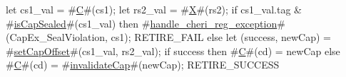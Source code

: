 let cs1_val = #\hyperref[sailRISCVzC]{C}#(cs1);
let rs2_val = #\hyperref[sailRISCVzX]{X}#(rs2);
if cs1_val.tag & #\hyperref[sailRISCVzisCapSealed]{isCapSealed}#(cs1_val) then {
  #\hyperref[sailRISCVzhandlezycherizyregzyexception]{handle\_cheri\_reg\_exception}#(CapEx_SealViolation, cs1);
  RETIRE_FAIL
} else {
  let (success, newCap) = #\hyperref[sailRISCVzsetCapOffset]{setCapOffset}#(cs1_val, rs2_val);
  if success then
    #\hyperref[sailRISCVzC]{C}#(cd) = newCap
  else
    #\hyperref[sailRISCVzC]{C}#(cd) = #\hyperref[sailRISCVzinvalidateCap]{invalidateCap}#(newCap);
  RETIRE_SUCCESS
}
